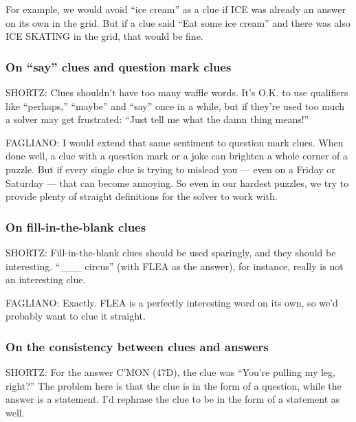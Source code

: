 For example, we would avoid ``ice cream'' as a clue if ICE was already
an answer on its own in the grid. But if a clue said ``Eat some ice
cream'' and there was also ICE SKATING in the grid, that would be fine.

\hypertarget{on-say-clues-and-question-mark-clues}{%
\subsubsection{On ``say'' clues and question mark
clues}\label{on-say-clues-and-question-mark-clues}}

SHORTZ: Clues shouldn't have too many waffle words. It's O.K. to use
qualifiers like ``perhaps,'' ``maybe'' and ``say'' once in a while, but
if they're used too much a solver may get frustrated: ``Just tell me
what the damn thing means!''

FAGLIANO: I would extend that same sentiment to question mark clues.
When done well, a clue with a question mark or a joke can brighten a
whole corner of a puzzle. But if every single clue is trying to mislead
you --- even on a Friday or Saturday --- that can become annoying. So
even in our hardest puzzles, we try to provide plenty of straight
definitions for the solver to work with.

\hypertarget{on-fill-in-the-blank-clues}{%
\subsubsection{On fill-in-the-blank
clues}\label{on-fill-in-the-blank-clues}}

SHORTZ: Fill-in-the-blank clues should be used sparingly, and they
should be interesting. ``\_\_\_ circus'' (with FLEA as the answer), for
instance, really is not an interesting clue.

FAGLIANO: Exactly. FLEA is a perfectly interesting word on its own, so
we'd probably want to clue it straight.

\hypertarget{on-the-consistency-between-clues-and-answers}{%
\subsubsection{On the consistency between clues and
answers}\label{on-the-consistency-between-clues-and-answers}}

SHORTZ: For the answer C'MON (47D), the clue was ``You're pulling my
leg, right?'' The problem here is that the clue is in the form of a
question, while the answer is a statement. I'd rephrase the clue to be
in the form of a statement as well.

